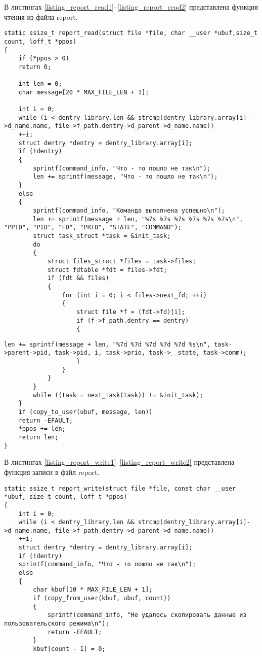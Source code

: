 \pagebreak

В листингах \ref{listing_report_read1}--\ref{listing_report_read2} представлена функция чтения из файла report.

\begin{center}
	\begin{lstlisting}[label=listing_report_read1,caption=Функция чтения из файла report]
static ssize_t report_read(struct file *file, char __user *ubuf,size_t count, loff_t *ppos)
{
	if (*ppos > 0)
	return 0;
	
	int len = 0;
	char message[20 * MAX_FILE_LEN + 1];
	
	int i = 0;
	while (i < dentry_library.len && strcmp(dentry_library.array[i]->d_name.name, file->f_path.dentry->d_parent->d_name.name))
	++i;
	struct dentry *dentry = dentry_library.array[i];
	if (!dentry)
	{
		sprintf(command_info, "Что - то пошло не так\n");
		len += sprintf(message, "Что - то пошло не так\n");
	}
	else
	{
		sprintf(command_info, "Команда выполнена успешно\n");
		len += sprintf(message + len, "%7s %7s %7s %7s %7s %7s\n", "PPID", "PID", "FD", "PRIO", "STATE", "COMMAND");
		struct task_struct *task = &init_task;
		do
		{
			struct files_struct *files = task->files;
			struct fdtable *fdt = files->fdt;
			if (fdt && files)
			{
				for (int i = 0; i < files->next_fd; ++i)
				{
					struct file *f = (fdt->fd)[i];
					if (f->f_path.dentry == dentry)
					{
\end{lstlisting}
\end{center}

\begin{center}
	\begin{lstlisting}[label=listing_report_read2,caption=Функция чтения из файла report]
						len += sprintf(message + len, "%7d %7d %7d %7d %7d %s\n", task->parent->pid, task->pid, i, task->prio, task->__state, task->comm);
					}
				}
			}
		}
		while ((task = next_task(task)) != &init_task);
	}
	if (copy_to_user(ubuf, message, len))
	return -EFAULT;
	*ppos += len;
	return len;
}
	\end{lstlisting}
\end{center}

В листингах \ref{listing_report_write1}--\ref{listing_report_write2} представлена функция записи в файл report.

\begin{center}
	\begin{lstlisting}[label=listing_report_write1,caption=Функция записи в файл report]
static ssize_t report_write(struct file *file, const char __user *ubuf, size_t count, loff_t *ppos)
{
	int i = 0;
	while (i < dentry_library.len && strcmp(dentry_library.array[i]->d_name.name, file->f_path.dentry->d_parent->d_name.name))
	++i;
	struct dentry *dentry = dentry_library.array[i];
	if (!dentry)
	sprintf(command_info, "Что - то пошло не так\n");
	else
	{
		char kbuf[10 * MAX_FILE_LEN + 1];
		if (copy_from_user(kbuf, ubuf, count))
		{
			sprintf(command_info, "Не удалось скопировать данные из пользовательского режима\n");
			return -EFAULT;
		}
		kbuf[count - 1] = 0;
	\end{lstlisting}
\end{center}

